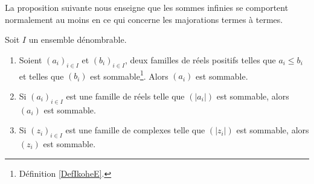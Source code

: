 La proposition suivante nous enseigne que les sommes infinies se comportent normalement au moins en ce qui concerne les majorations termes à termes.
\begin{proposition} \label{PropMpBStL}
	Soit \( I\) un ensemble dénombrable. 
    \begin{enumerate}
        \item       \label{ITEMooZSDSooFUqXDO}
            Soient \( (a_i)_{i\in I}\) et \( (b_i)_{i\in I}\), deux familles de réels positifs telles que \( a_i\leq b_i\) et telles que \( (b_i)\) est sommable\footnote{Définition \ref{DefIkoheE}.}. Alors \( (a_i)\) est sommable.
        \item       \label{ITEMooREEYooOtklRb}
	Si \( (a_i)_{i\in I}\) est une famille de réels telle que \( (| a_i |)\) est sommable, alors \( (a_i)\) est sommable.
\item           \label{ITEMooFIGGooWADdLs}
	Si \( (z_i)_{i\in I}\) est une famille de complexes telle que \( (| z_i |)\) est sommable, alors \( (z_i)\) est sommable.
    \end{enumerate}
\end{proposition}

